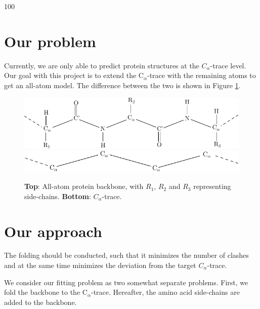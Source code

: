 \documentclass[a0,portrait]{a0poster}
\newcommand{\Ca}{C$_{\alpha}${}}
\begin{document}
\begin{GridBlock}{0}{21}{100}
\begin{multicols}{3}
\section{Our problem}
Currently, we are only able to predict protein structures at the $C_\alpha$-trace level. 
Our goal with this project is to extend the \Ca-trace with the remaining atoms to get an all-atom model.
The difference between the two is shown in Figure \ref{fig:all-atom_vs_trace}.

\begin{figure}
  \centering
  \vspace{1cm}
  \includegraphics[width=0.65\columnwidth]{../rapport/figures/amino_connect}  
  \\[1cm]
  \includegraphics[width=0.65\columnwidth]{../rapport/figures/Calpha_backbone}
  \caption{\textbf{Top}: All-atom protein backbone, with $R_1$, $R_2$ and $R_3$ representing side-chains. \textbf{Bottom}: $C_{\alpha}$-trace. }
  \label{fig:all-atom_vs_trace}
\end{figure}

\section{Our approach}
The folding should be conducted, such that it minimizes the number of clashes and at the same time minimizes the deviation from the target $C_\alpha$-trace.

We consider our fitting problem as two somewhat separate problems.
First, we fold the backbone to the \Ca-trace.
Hereafter, the amino acid side-chains are added to the backbone.



\end{multicols}
\end{GridBlock}
\end{document}
